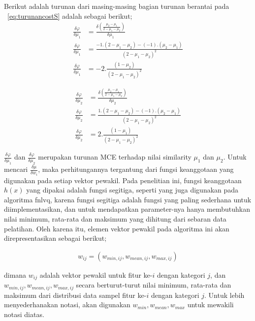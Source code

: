 \noindent Berikut adalah turunan dari masing-masing bagian turunan berantai pada
\equ~\ref{eq:turunancostS} adalah sebagai berikut; 
\begin{align}
\label{eq:turunanmce1}
	\frac{\delta \varphi}{\delta \mu_1} &= 
	\frac{\delta \left(\frac{\mu_2-\mu_1}{2-\mu_1-\mu_2}\right)}{\delta \mu_1} 
	\nonumber \\ \frac{\delta \varphi}{\delta \mu_1} &=  
	\frac{-1 . (2 - \mu_1 - \mu_2) - (-1).(\mu_2-\mu_1)}
	{(2 - \mu_1 - \mu_2)^2} \nonumber \\
	\frac{\delta \varphi}{\delta \mu_1} &=  
	-2.\frac{(1 - \mu_2)}{(2 - \mu_1 - \mu_2)^2}
\end{align}

\begin{align}
\label{eq:turunanmce2}
	\frac{\delta \varphi}{\delta \mu_2} &= 
	\frac{\delta \left(\frac{\mu_2-\mu_1}{2-\mu_1-\mu_2}\right)}{\delta \mu_2} 
	\nonumber \\ \frac{\delta \varphi}{\delta \mu_2} &=  
	\frac{1 . (2 - \mu_1 - \mu_2) - (-1).(\mu_2-\mu_1)}
	{(2 - \mu_1 - \mu_2)^2} \nonumber \\
	\frac{\delta \varphi}{\delta \mu_2} &=  
	2.\frac{(1 - \mu_1)}{(2 - \mu_1 - \mu_2)^2}
\end{align}

$\frac{\delta \varphi}{\delta \mu_1}$ dan $\frac{\delta \varphi}{\delta
\mu_2}$ merupakan turunan MCE terhadap nilai similarity $\mu_1$ dan $\mu_2$.
Untuk mencari $\frac{\delta \mu}{\delta w_i}$, maka perhitungannya tergantung
dari fungsi keanggotaan yang digunakan pada setiap vektor pewakil. Pada
penelitian ini, fungsi keanggotaan $h(x)$ yang dipakai adalah fungsi segitiga,
seperti yang juga digunakan pada algoritma \gls{fnlvq}, karena fungsi segitiga adalah
fungsi yang paling sederhana untuk diimplementasikan, dan untuk mendapatkan
parameter-nya hanya membutuhkan nilai minimum, rata-rata dan maksimum yang
dihitung dari sebaran data pelatihan. Oleh karena itu, elemen vektor pewakil
pada algoritma ini akan direpresentasikan sebagai berikut;

\begin{align}
\label{eq:trimbobot}
	w_{ij} = (w_{min,ij}, w_{mean,ij}, w_{max,ij})
\end{align}

\noindent dimana $w_{ij}$ adalah vektor pewakil untuk fitur ke-$i$ dengan
kategori $j$, dan $w_{min,ij}, w_{mean,ij}, w_{max,ij}$ secara
berturut-turut nilai minimum, rata-rata dan maksimum dari distribusi data sampel
fitur ke-$i$ dengan kategori $j$. Untuk lebih menyederhanakan notasi, akan
digunakan $w_{min}, w_{mean}, w_{max}$ untuk mewakili notasi diatas.

